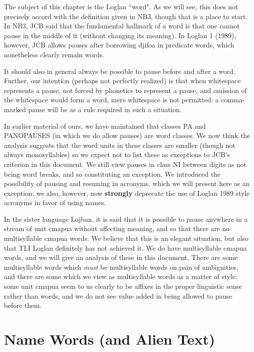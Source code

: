 \documentclass[12pt]{book}
\begin{document}
The subject of this chapter is the Loglan ``word".  As we will see, this does not precisely accord with the definition given in NB3, though that is a place to start.  In NB3, JCB said that the fundamental hallmark of a word is that one cannot pause in the middle of it (without changing its meaning).
In Loglan 1 (1989), however, JCB allows pauses after borrowing djifoa in predicate words, which nonetheless clearly remain words.

It should also in general always be possible to pause before and after a word.  Further, our intention (perhaps not perfectly realized) is that when whitespace represents a pause, not forced by phonetics to represent a pause, and omission of the whitespace would form a word, mere whitespace is not permitted:  a comma-marked pause will be as a rule required in such a situation.

In earlier material of ours, we have maintained that classes PA and PANOPAUSES (in which we do allow pauses) are word classes.  We now think the analysis suggests that the word units
in these classes are smaller (though not always monosyllables) so we expect not to list these as exceptions to JCB's criterion in this document.  We still view pauses in class NI between digits as not being word breaks, and so constituting an exception.  We introduced the possibility of pausing
and resuming in acronyms, which we will present here as an exception;  we also, however, now {\bf strongly} deprecate the use of Loglan 1989 style acronyms in favor of using names.

In the sister language Lojban, it is said that it is possible to pause anywhere in a stream of unit cmapua without affecting meaning, and so that there are no multisyllable cmapua words.
We believe that this is an elegant situation, but also that TLI Loglan definitely has not achieved it.  We do have multisyllable cmapua words, and we will give an analysis of these in this document.
There are some multisyllable words which {\em must\/} be multisyllable words on pain of ambiguities, and there are some which we view as multisyllable words as a matter of style:  some unit cmapua seem to us clearly to be affixes in the proper linguistic sense rather than words, and we do not see value added in being allowed to pause before them.

\section{Name Words (and Alien Text)}
\end{document}
